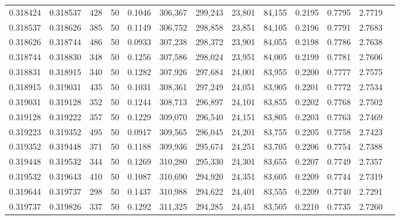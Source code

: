 \begin{tabular}{rrrrrrrrrrrrr}
0.318424 & 0.318537 &   428 &  50 &                                     0.1046 & 306,367 & 299,243 &  23,801 &  84,155 & 0.2195 & 0.7795 & 2.7719 \\
0.318537 & 0.318626 &   385 &  50 &                                     0.1149 & 306,752 & 298,858 &  23,851 &  84,105 & 0.2196 & 0.7791 & 2.7683 \\
0.318626 & 0.318744 &   486 &  50 &                                     0.0933 & 307,238 & 298,372 &  23,901 &  84,055 & 0.2198 & 0.7786 & 2.7638 \\
0.318744 & 0.318830 &   348 &  50 &                                     0.1256 & 307,586 & 298,024 &  23,951 &  84,005 & 0.2199 & 0.7781 & 2.7606 \\
0.318831 & 0.318915 &   340 &  50 &                                     0.1282 & 307,926 & 297,684 &  24,001 &  83,955 & 0.2200 & 0.7777 & 2.7575 \\
0.318915 & 0.319031 &   435 &  50 &                                     0.1031 & 308,361 & 297,249 &  24,051 &  83,905 & 0.2201 & 0.7772 & 2.7534 \\
0.319031 & 0.319128 &   352 &  50 &                                     0.1244 & 308,713 & 296,897 &  24,101 &  83,855 & 0.2202 & 0.7768 & 2.7502 \\
0.319128 & 0.319222 &   357 &  50 &                                     0.1229 & 309,070 & 296,540 &  24,151 &  83,805 & 0.2203 & 0.7763 & 2.7469 \\
0.319223 & 0.319352 &   495 &  50 &                                     0.0917 & 309,565 & 296,045 &  24,201 &  83,755 & 0.2205 & 0.7758 & 2.7423 \\
0.319352 & 0.319448 &   371 &  50 &                                     0.1188 & 309,936 & 295,674 &  24,251 &  83,705 & 0.2206 & 0.7754 & 2.7388 \\
0.319448 & 0.319532 &   344 &  50 &                                     0.1269 & 310,280 & 295,330 &  24,301 &  83,655 & 0.2207 & 0.7749 & 2.7357 \\
0.319532 & 0.319643 &   410 &  50 &                                     0.1087 & 310,690 & 294,920 &  24,351 &  83,605 & 0.2209 & 0.7744 & 2.7319 \\
0.319644 & 0.319737 &   298 &  50 &                                     0.1437 & 310,988 & 294,622 &  24,401 &  83,555 & 0.2209 & 0.7740 & 2.7291 \\
0.319737 & 0.319826 &   337 &  50 &                                     0.1292 & 311,325 & 294,285 &  24,451 &  83,505 & 0.2210 & 0.7735 & 2.7260 \\

\end{tabular}
